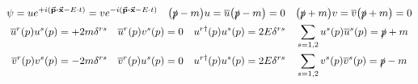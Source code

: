 \begin{gather*}
        \psi
        = ue^{+i\qty(\va{p}\vdot\va{x} - E\cdot t)}
        = ve^{-i\qty(\va{p}\vdot\va{x} - E\cdot t)}
        \quad
        \qty(\slashed{p}-m)u
        = \overline{u}\qty(\slashed{p}-m)
        = 0
        \quad
        \qty(\slashed{p}+m)v
        = \overline{v}\qty(\slashed{p}+m)
        = 0
        \\
        \overline{u}^r(p)u^s(p) = +2m\delta^{rs}
        \quad
        \overline{u}^r(p)v^s(p) = 0
        \quad
        u^{r\dagger}(p)u^s(p) = 2E\delta^{rs}
        \quad
        \sum_{s=1,2}u^s(p)\overline{u}^s(p) = \slashed{p} + m
        \\
        \overline{v}^r(p)v^s(p) = -2m\delta^{rs}
        \quad
        \overline{v}^r(p)u^s(p) = 0
        \quad
        u^{r\dagger}(p)u^s(p) = 2E\delta^{rs}
        \quad
        \sum_{s=1,2}v^s(p)\overline{v}^s(p) = \slashed{p} - m
\end{gather*}
